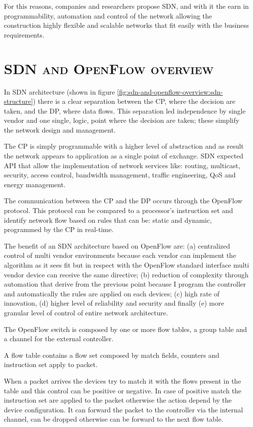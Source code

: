 For this reasons, companies and researchers propose \ac{SDN}, and with it the earn in programmability, automation and control of the network allowing the construction highly flexible and scalable networks that fit easily with the business requirements.

\section*{\small \textsc{\ac{SDN} and OpenFlow overview}}
In \ac{SDN} architecture (shown in figure \ref{fig:sdn-and-openflow-overview:sdn-structure}) there is a clear separation between the \ac{CP}, where the decision are taken, and the \ac{DP}, where data flows. This separation led independence by single vendor and one single, logic, point where the decision are taken; these simplify the network design and management.

The \ac{CP} is simply programmable with a higher level of abstraction and as result the network appears to application as a single point of exchange.
\ac{SDN} expected \ac{API} that allow the implementation of network services like: routing, multicast, security, access control, bandwidth management, traffic engineering, \ac{QoS} and energy management.

The communication between the \ac{CP} and the \ac{DP} occurs through the OpenFlow protocol. This protocol can be compared to a processor's instruction set and identify network flow based on rules that can be: static and dynamic, programmed by the \ac{CP} in real-time.

The benefit of an \ac{SDN} architecture based on OpenFlow are: (a) centralized control of multi vendor environments because each vendor can implement the algorithm as it sees fit but in respect with the OpenFlow standard interface multi vendor device can receive the same directive; (b) reduction of complexity through automation that derive from the previous point because I program the controller and automatically the rules are applied on each devices; (c) high rate of innovation, (d) higher level of reliability and security and finally (e) more granular level of control of entire network architecture.

The OpenFlow switch is composed by one or more flow tables, a group table and a channel for the external controller.

A flow table contains a flow set composed by match fields, counters and instruction set apply to packet.

When a packet arrives the devices try to match it with the flows present in the table and this control can be positive or negative. In case of positive match the instruction set are applied to the packet otherwise the action depend by the device configuration. It can forward the packet to the controller via the internal channel, can be dropped otherwise can be forward to the next flow table.

